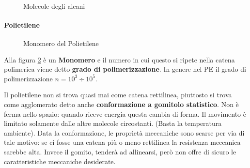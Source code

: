 \begin{figure}
\centering
{}\quad
{}\\
\quad
{}
\caption{Molecole degli alcani}
\label{fig:Alcani}
\end{figure}

\paragraph{Polietilene}
\begin{figure}
\centering
{}
\caption{Monomero del Polietilene}
\label{fig:PE}
\end{figure}

Alla figura \ref{fig:PE} è un \textbf{Monomero} e il numero in cui questo si ripete nella catena polimerica viene detto \textbf{grado di polimerizzazione}.
In genere nel \ac{PE} il grado di polimerizzazione $n = 10^3 \div 10^5$.

Il polietilene non si trova quasi mai come catena rettilinea, piuttosto si trova come agglomerato detto anche \textbf{conformazione a gomitolo statistico}.
Non è ferma nello spazio: quando riceve energia questa cambia di forma. Il movimento è limitato solamente dalle altre molecole circostanti. (Basta la temperatura ambiente).
Data la conformazione, le proprietà meccaniche sono scarse per via di tale motivo: se ci fosse una catena più o meno rettilinea la resistenza meccanica sarebbe alta.
Invece il gomito, tenderà ad allinearsi, però non offre di sicuro le caratteristiche meccaniche desiderate.

